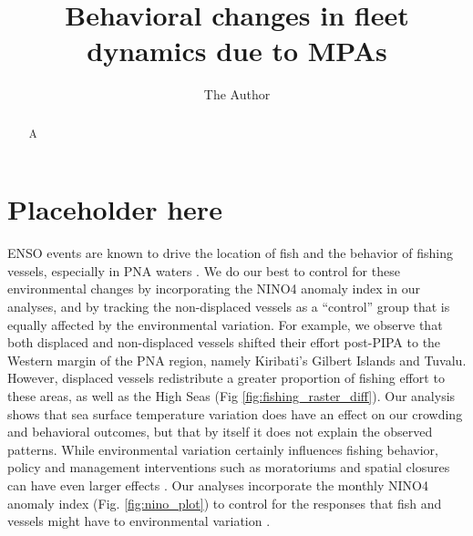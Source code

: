\documentclass[12pt]{article}
\title{Behavioral changes in fleet dynamics due to MPAs}
\author{The Author}
\begin{document}
\maketitle

\begin{abstract}
A
\end{abstract}

\section{Placeholder here}

ENSO events are known to drive the location of fish and the behavior of fishing vessels, especially in PNA waters \cite{lehodey_1997,kroodsma_2018,aqorau_2018}. We do our best to control for these environmental changes by incorporating the NINO4 anomaly index in our analyses, and by tracking the non-displaced vessels as a ``control'' group that is equally affected by the environmental variation. For example, we observe that both displaced and non-displaced vessels shifted their effort post-PIPA to the Western margin of the PNA region, namely Kiribati's Gilbert Islands and Tuvalu. However, displaced vessels redistribute a greater proportion of fishing effort to these areas, as well as the High Seas (Fig \ref{fig:fishing_raster_diff}). Our analysis shows that sea surface temperature variation does have an effect on our crowding and behavioral outcomes, but that by itself it does not explain the observed patterns. While environmental variation certainly influences fishing behavior, policy and management interventions such as moratoriums and spatial closures can have even larger effects \cite{kroodsma_2018}.  Our analyses incorporate the monthly NINO4 anomaly index (Fig. \ref{fig:nino_plot}) to control for the responses that fish and vessels might have to environmental variation \cite{lehodey_1997,kroodsma_2018,aqorau_2018}.
\end{document}
